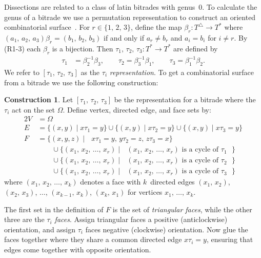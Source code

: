 \documentclass[12pt,amstags,fleqn]{article}
\theoremstyle{plain}
\theoremstyle{definition}
\newtheorem{construction}[theorem]{Construction}
\newcommand{\darts}{\Omega}
\def\ll{{\textstyle \ast}}
\def\rr{{\scriptscriptstyle \triangle}}
\newcommand{\opa}{\ll}
\newcommand{\opb}{\rr}
\begin{document}
Dissections are related to a class of latin bitrades with genus~$0$. To
calculate the genus of a bitrade we use a permutation representation to
construct an oriented combinatorial surface~\cite{Dr9,hamalainen2007,ales-geometrical}.
For $r \in \{1,\, 2,\, 3\}$, define the map 
$\beta_r \colon T^{\opb} \rightarrow
T^{\opa}$ where $(a_1,\, a_2,\, a_3) \beta_r = (b_1,\, b_2,\, b_3)$ if and only if
$a_r \neq b_r$
and $a_i = b_i$ for $i \neq r$.
By (R1-3)
each $\beta_r$ is a bijection.
Then
$\tau_1,\, \tau_2,\, \tau_3\colon T^{\opa} \rightarrow
T^{\opa}$ are defined by
\begin{align}
\tau_1 &= \beta_2^{-1}\beta_3, \qquad
\tau_2 = \beta_3^{-1}\beta_1, \qquad
\tau_3 = \beta_1^{-1}\beta_2. \label{eqnTau}
\end{align}
We refer to
$[\tau_1,\, \tau_2,\, \tau_3]$
as the $\tau_i$ {\em representation}. To get a combinatorial surface
from a bitrade we use the following construction:

\begin{construction}\label{constructionTauiSurface}
Let $[\tau_1,\, \tau_2,\, \tau_3]$ be the representation for 
a bitrade where the $\tau_i$ act on
the set $\darts$. Define
vertex, directed edge, and face sets by:
\begin{alignat*}{2}
V &= \darts \\
E &= \{ (x,y) \mid x \tau_1 = y \} \cup \{ (x,y) \mid x \tau_2 = y \} \cup \{ (x,y) \mid x \tau_3 = y \} \\
F &= \{ (x,y,z) \mid \text{ $x \tau_1 = y$, $y \tau_2 = z$, $z \tau_3 = x$} \} \\
  & \qquad \cup \{ (x_1,\, x_2,\, \dots,\, x_r) \mid \text{ $(x_1,\,
x_2,\, \dots,\, x_r)$ is a cycle of $\tau_1$ } \} \\
  & \qquad \cup \{ (x_1,\, x_2,\, \dots,\, x_r) \mid \text{ $(x_1,\,
x_2,\, \dots,\, x_r)$ is a cycle of $\tau_2$ } \} \\
  & \qquad \cup \{ (x_1,\, x_2,\, \dots,\, x_r) \mid \text{ $(x_1,\,
x_2,\, \dots,\, x_r)$ is a cycle of $\tau_3$ } \}
\end{alignat*}
where $(x_1,\, x_2,\, \dots,\, x_k)$ denotes a face with $k$~directed edges
$(x_1,\, x_2)$, $(x_2,\, x_3)$, $\dots$,
$(x_{k-1},\, x_k)$, $(x_k,\, x_1)$ for vertices
$x_1,\, \dots,\, x_k$.

The first set in the definition of $F$ is the set of {\em triangular
faces}, while the other three are the {\em $\tau_i$ faces}.
Assign triangular faces a positive (anticlockwise) orientation, and
assign
$\tau_i$ faces negative (clockwise) orientation. Now glue the faces
together where they share a common directed edge $x \tau_i = y$,
ensuring that edges come together with opposite orientation.
\end{construction}
\end{document}
